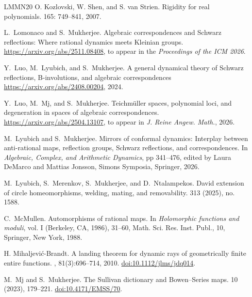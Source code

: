 \documentclass[11pt,a4paper, oneside]{amsart}
\theoremstyle{definition}
\theoremstyle{remark}
\numberwithin{equation}{section}
\begin{document}
\begin{thebibliography}{LMMN20}
O. Kozlovski, W. Shen, and S. van Strien.
\newblock Rigidity for real polynomials.
 165: 749--841, 2007.

L.~Lomonaco and S.~Mukherjee.
\newblock Algebraic correspondences and Schwarz reflections: Where rational dynamics meets Kleinian groups.
\newblock \url{https://arxiv.org/abs/2511.08408}, to appear in the {\em Proceedings of the ICM 2026}.

Y.~Luo, M.~Lyubich, and S.~Mukherjee.
\newblock A general dynamical theory of Schwarz reflections, B-involutions, and algebraic correspondences
\newblock \url{https://arxiv.org/abs/2408.00204}, 2024.

Y.~Luo, M.~Mj, and S.~Mukherjee.
\newblock Teichm{\"u}ller spaces, polynomial loci, and degeneration in spaces of algebraic correspondences.
\newblock \url{https://arxiv.org/abs/2504.13107}, to appear in {\em J. Reine Angew. Math.}, 2026.

M.~Lyubich and S.~Mukherjee.
\newblock Mirrors of conformal dynamics: Interplay between anti-rational maps, reflection groups, Schwarz reflections, and correspondences.
\newblock In {\em Algebraic, Complex, and Arithmetic Dynamics}, pp 341--476, edited by Laura DeMarco and Mattias Jonsson, Simons Symposia, Springer, 2026.

M.~Lyubich, S.~Merenkov, S.~Mukherjee, and D.~Ntalampekos.
\newblock David extension of circle homeomorphisms, welding, mating, and removability.
 313 (2025), no. 1588. 


C.~McMullen.
\newblock Automorphisms of rational maps.
\newblock In {\em Holomorphic functions and moduli}, vol. I (Berkeley, CA, 1986), 31--60,  Math. Sci. Res. Inst. Publ., 10, Springer, New York, 1988. 

H. Mihaljevi{\'c}-Brandt.
\newblock A landing theorem for dynamic rays of geometrically finite entire functions.
, 81(3):696--714, 2010.
\newblock \href{https://doi.org/10.1112/jlms/jdq014}{doi:10.1112/jlms/jdq014}.

M.~Mj and S.~Mukherjee.
\newblock The Sullivan dictionary and Bowen--Series maps.
 10 (2023), 179--221.
\newblock \href{https://doi.org/10.4171/EMSS/70}{doi:10.4171/EMSS/70}.


\end{thebibliography}
\end{document}
